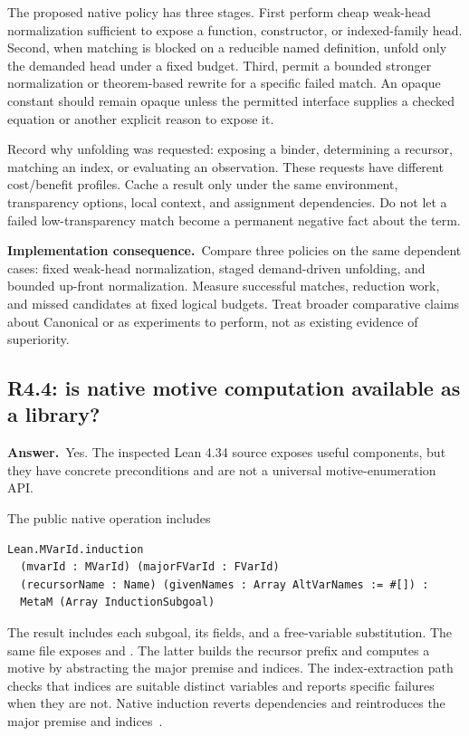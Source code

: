 \documentclass[11pt,a4paper]{article}
\theoremstyle{definition}
\theoremstyle{remark}
\newcommand{\code}[1]{\texttt{\detokenize{#1}}}
\newcommand{\ans}{\noindent\textbf{Answer.}\ }
\newcommand{\imp}{\par\noindent\textbf{Implementation consequence.}\ }
\begin{document}
The proposed native policy has three stages. First perform cheap weak-head
normalization sufficient to expose a function, constructor, or indexed-family
head. Second, when matching is blocked on a reducible named definition, unfold
only the demanded head under a fixed budget. Third, permit a bounded stronger
normalization or theorem-based rewrite for a specific failed match. An opaque
constant should remain opaque unless the permitted interface supplies a
checked equation or another explicit reason to expose it.

Record why unfolding was requested: exposing a binder, determining a recursor,
matching an index, or evaluating an observation. These requests have different
cost/benefit profiles. Cache a result only under the same environment,
transparency options, local context, and assignment dependencies. Do not let a
failed low-transparency match become a permanent negative fact about the term.

\imp Compare three policies on the same dependent cases: fixed weak-head
normalization, staged demand-driven unfolding, and bounded up-front
normalization. Measure successful matches, reduction work, and missed
candidates at fixed logical budgets. Treat broader comparative claims about
Canonical or \code{sauto} as experiments to perform, not as existing evidence
of superiority.

\subsection{R4.4: is native motive computation available as a library?}\label{q:R4.4}
\ans Yes. The inspected Lean 4.34 source exposes useful components, but they
have concrete preconditions and are not a universal motive-enumeration API.

The public native operation includes
\begin{lstlisting}
Lean.MVarId.induction
  (mvarId : MVarId) (majorFVarId : FVarId)
  (recursorName : Name) (givenNames : Array AltVarNames := #[]) :
  MetaM (Array InductionSubgoal)
\end{lstlisting}
The result includes each subgoal, its fields, and a free-variable substitution.
The same file exposes \code{getMajorTypeIndices} and
\code{mkRecursorAppPrefix}. The latter builds the recursor prefix and computes
a motive by abstracting the major premise and indices. The index-extraction
path checks that indices are suitable distinct variables and reports specific
failures when they are not. Native induction reverts dependencies and
reintroduces the major premise and indices~\cite{lean-induction-source}.
\end{document}
